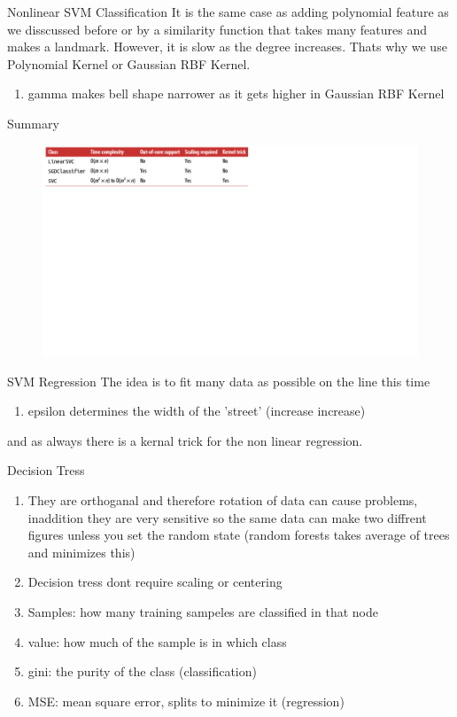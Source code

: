 \documentclass{beamer}
\begin{document}
\begin{frame}{Nonlinear SVM Classification}
It is the same case as adding polynomial feature as we disscussed before or by a similarity function that takes many features and makes a landmark. However, it is slow as the degree increases. Thats why we use Polynomial Kernel or Gaussian RBF Kernel.
\begin{enumerate}
\item gamma makes bell shape narrower as it gets higher in Gaussian RBF Kernel
\end{enumerate}
\end{frame}
\begin{frame}{Summary}
\begin{figure}
\begin{center}
\centering
  \includegraphics[totalheight=1.3\textheight]{Class_kernal.png}
\end{center}
\end{figure}
\end{frame}
\begin{frame}{SVM Regression}
The idea is to fit many data as possible on the line this time
\begin{enumerate}
\item epsilon determines the width of the 'street' (increase increase)
\end{enumerate}
and as always there is a kernal trick for the non linear regression.
\end{frame}
\begin{frame}{Decision Tress}
\begin{enumerate}
\item They are orthoganal and therefore rotation of data can cause problems, inaddition they are very sensitive so the same data can make two diffrent figures unless you set the random state (random forests takes average of trees and minimizes this)
\item Decision tress dont require scaling or centering
\item Samples: how many training sampeles are classified in that node
\item value: how much of the sample is in which class
\item gini: the purity of the class (classification)
\item MSE: mean square error, splits to minimize it (regression)
\end{enumerate}
\end{frame}
\end{document}
